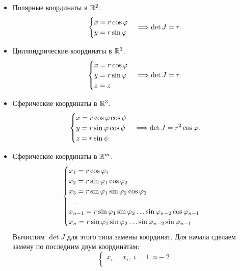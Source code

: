 {\begin{example}
    \enewline
    \begin{itemize}
        \item Полярные координаты в $\mathbb{R}^2$.
            \[
                \begin{cases}
                    x = r \cos{\varphi} \\ 
                    y = r \sin{\varphi}
                \end{cases} \Longrightarrow \det{J} = r
            .\]
        \item Циллиндрические координаты в $\mathbb{R}^3$.
            \[
                \begin{cases}
                    x = r \cos{\varphi} \\
                    y = r \sin{\varphi} \\
                    z = z
                \end{cases} \Longrightarrow \det{J} = r
            .\]
        \item Сферические координаты в $\mathbb{R}^3$.
            \[
                \begin{cases}
                    x = r \cos{\varphi} \cos{\psi} \\
                    y = r \sin{\varphi} \cos{\psi} \\
                    z = r \sin{\psi}
                \end{cases} \Longrightarrow \det{J} = r^2 \cos{\varphi}
            .\]
        \item Сферические координаты в $\mathbb{R}^m$.
            \[
                \begin{cases}
                    x_1 = r \cos{\varphi_1} \\
                    x_2 = r \sin{\varphi_1} \cos{\varphi_2} \\
                    x_3 = r \sin{\varphi_1} \sin{\varphi_2} \cos{\varphi_3} \\
                    \ldots \\
                    x_{n - 1} = r \sin{\varphi_1} \sin{\varphi_2} \ldots \sin{\varphi_{n - 2}} \cos{\varphi_{n - 1}} \\
                    x_n = r \sin{\varphi_1} \sin{\varphi_2} \ldots \sin{\varphi_{n - 2}} \sin{\varphi_{n - 1}} 
                \end{cases}
            \]
            Вычислим $\det{J}$ для этого типа замены координат. Для начала сделаем замену
            по последним двум координатам:
            \[
                \begin{cases}
                    x_i = x_i,~ i = 1..{n-2} \\

\end{cases}\]
\end{itemize}
\end{example}}
